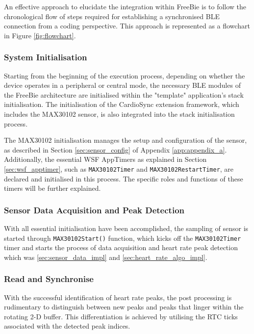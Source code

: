 \noindent An effective approach to elucidate the integration within FreeBie is to follow the chronological flow of steps required for establishing a synchronised BLE connection from a coding perspective. This approach is represented as a flowchart in Figure \ref{fig:flowchart}.


\subsubsection{System Initialisation}
Starting from the beginning of the execution process, depending on whether the device operates in a peripheral or central mode, the necessary BLE modules of the FreeBie architecture are initialised within the "template" application's stack initialisation. The initialisation of the CardioSync extension framework, which includes the MAX30102 sensor, is also integrated into the stack initialisation process.
\vspace{1\baselineskip}

\noindent The MAX30102 initialisation manages the setup and configuration of the sensor, as described in Section \ref{sec:sensor_config} of Appendix \ref{app:appendix_a}. Additionally, the essential WSF AppTimers as explained in Section \ref{sec:wsf_apptimer}, such as \texttt{MAX30102Timer} and \texttt{MAX30102RestartTimer}, are declared and initialised in this process. The specific roles and functions of these timers will be further explained. 

\subsubsection{Sensor Data Acquisition and Peak Detection}
With all essential initialisation have been accomplished, the sampling of sensor is started through \texttt{MAX30102Start()} function, which kicks off the \texttt{MAX30102Timer} timer and starts the process of data acquisition and heart rate peak detection which was \ref{sec:sensor_data_impl} and \ref{sec:heart_rate_algo_impl}.

\subsubsection{Read and Synchronise}
With the successful identification of heart rate peaks, the post processing is rudimentary to distinguish between new peaks and peaks that linger within the rotating 2-D buffer. This differentiation is achieved by utilising the RTC ticks associated with the detected peak indices.
\vspace{1\baselineskip}

